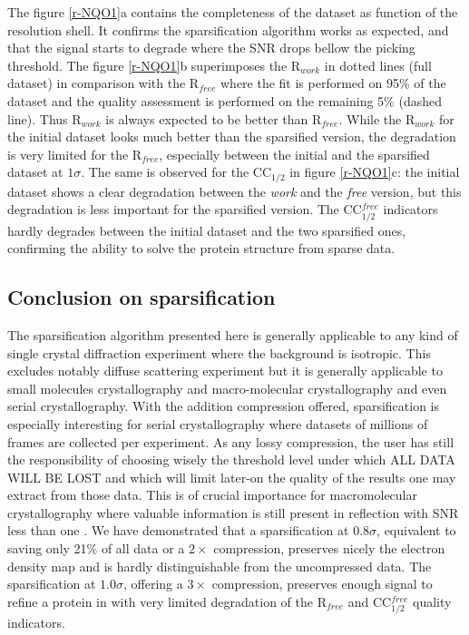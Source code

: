 \documentclass[preprint]{iucr}              %
\begin{document}
The figure \ref{r-NQO1}a contains the completeness of the dataset as function of the resolution shell. 
It confirms the sparsification algorithm works as expected, and that the signal starts to degrade where the SNR drops bellow the picking threshold. 
The figure \ref{r-NQO1}b superimposes the R$_{work}$ in dotted lines (full dataset) in comparison with the R$_{free}$ where the fit is performed on 95\% of the dataset and the quality assessment is performed on the remaining 5\% (dashed line).
Thus R$_{work}$ is always expected to be better than R$_{free}$.
While the R$_{work}$ for the initial dataset looks much better than the sparsified version, the degradation is very limited for the R$_{free}$, especially between the initial and the sparsified dataset at $1\sigma$.
The same is observed for the CC$_{1/2}$ in figure \ref{r-NQO1}c: the initial dataset shows a clear degradation between the \textit{work} and the \textit{free} version, but this degradation is less important for the sparsified version.
The CC$_{1/2}^{free}$ indicators hardly degrades between the initial dataset and the two sparsified ones, confirming the ability to solve the protein structure from sparse data.

\subsection{Conclusion on sparsification}
The sparsification algorithm presented here is generally applicable to any kind of single crystal diffraction experiment where the background is isotropic. 
This excludes notably diffuse scattering experiment but it is generally applicable to small molecules crystallography and macro-molecular crystallography and even serial crystallography.
With the addition compression offered, sparsification is especially interesting for serial crystallography where datasets of millions of frames are collected per experiment.
As any lossy compression, the user has still the responsibility of choosing wisely the threshold level under which ALL DATA WILL BE LOST and which will limit later-on the quality of the results one may extract from those data. 
This is of crucial importance for macromolecular crystallography where valuable information is still present in reflection with SNR less than one \cite{cc1/2}.
We have demonstrated that a sparsification at $0.8\sigma$, equivalent to saving only 21\% of all data
or a $2\times$ compression, preserves nicely the electron density map and is hardly distinguishable from the uncompressed data.
The sparsification at $1.0\sigma$, offering a $3\times$ compression, preserves enough signal to refine a protein in with very limited degradation of the R$_{free}$ and CC$_{1/2}^{free}$ quality indicators.
\end{document}

